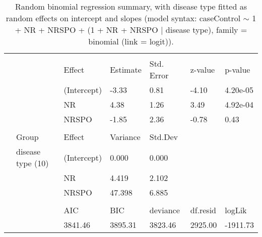 \begin{table}

\caption{\label{tab:}Random binomial regression summary, with disease type fitted as random effects on intercept and slopes (model syntax: caseControl $\sim$ 1 + NR + NRSPO + (1 + NR + NRSPO $\mid$ disease type), family = binomial (link = logit)).}
\centering
\begin{tabular}[t]{lllllll}
\toprule
\addlinespace[0.3em]
\multicolumn{7}{l}{\textbf{Fixed effects}}\\
\hspace{1em} &  & Effect & Estimate & Std. Error & z-value & p-value\\
\hspace{1em} &  & (Intercept) & -3.33 & 0.81 & -4.10 & 4.20e-05\\
\hspace{1em} &  & NR & 4.38 & 1.26 & 3.49 & 4.92e-04\\
\hspace{1em} &  & NRSPO & -1.85 & 2.36 & -0.78 & 0.43\\
\addlinespace[0.3em]
\multicolumn{7}{l}{\textbf{Random effects}}\\
\hspace{1em} & Group & Effect & Variance & Std.Dev &  & \\
\hspace{1em} & disease type (10) & (Intercept) & 0.000 & 0.000 &  & \\
\hspace{1em} &  & NR & 4.419 & 2.102 &  & \\
\hspace{1em} &  & NRSPO & 47.398 & 6.885 &  & \\
\addlinespace[0.3em]
\multicolumn{7}{l}{\textbf{Model quality}}\\
\hspace{1em} &  & AIC & BIC & deviance & df.resid & logLik\\
 &  & 3841.46 & 3895.31 & 3823.46 & 2925.00 & -1911.73\\
\bottomrule
\end{tabular}
\end{table}
